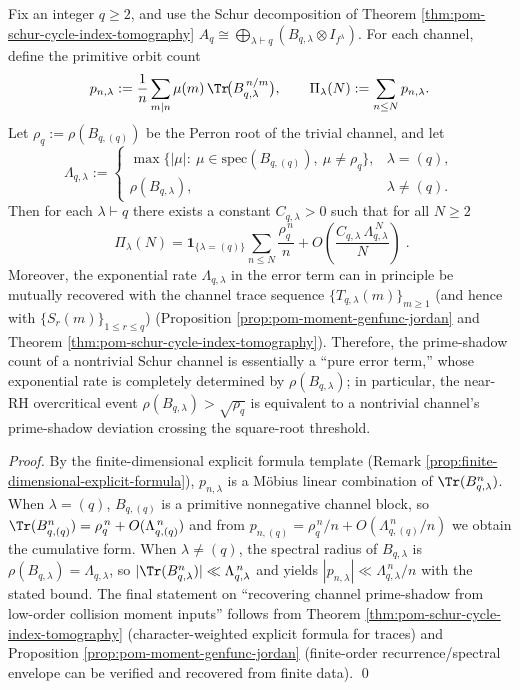 \begin{theorem}\label{thm:pom-schur-chebotarev-prime-deviation}
Fix an integer \(q\ge2\), and use the Schur decomposition of Theorem \ref{thm:pom-schur-cycle-index-tomography}
\(
A_q\cong\bigoplus_{\lambda\vdash q}(B_{q,\lambda}\otimes I_{f^\lambda})
\).
For each channel, define the primitive orbit count
\[
p_{n,\lambda}:=\frac{1}{n}\sum_{m\mid n}\mu(m)\,\Tr\!\bigl(B_{q,\lambda}^{\,n/m}\bigr),
\qquad
\Pi_\lambda(N):=\sum_{n\le N}p_{n,\lambda}.
\]
Let \(\rho_q:=\rho(B_{q,(q)})\) be the Perron root of the trivial channel, and let
\[
\Lambda_{q,\lambda}:=
\begin{cases}
\max\{|\mu|:\ \mu\in\mathrm{spec}(B_{q,(q)}),\ \mu\neq \rho_q\}, & \lambda=(q),\\[2pt]
\rho(B_{q,\lambda}), & \lambda\neq(q).
\end{cases}
\]
Then for each \(\lambda\vdash q\) there exists a constant \(C_{q,\lambda}>0\) such that for all \(N\ge2\)
\[
\boxed{\;
\Pi_\lambda(N)
=\mathbf 1_{\{\lambda=(q)\}}\sum_{n\le N}\frac{\rho_q^{\,n}}{n}
+O\!\left(\frac{C_{q,\lambda}\,\Lambda_{q,\lambda}^{\,N}}{N}\right)\; }.
\]
Moreover, the exponential rate \(\Lambda_{q,\lambda}\) in the error term can in principle be mutually recovered with the channel trace sequence \(\{T_{q,\lambda}(m)\}_{m\ge1}\) (and hence with \(\{S_r(m)\}_{1\le r\le q}\)) (Proposition \ref{prop:pom-moment-genfunc-jordan} and Theorem \ref{thm:pom-schur-cycle-index-tomography}).
Therefore, the prime-shadow count of a nontrivial Schur channel is essentially a ``pure error term,'' whose exponential rate is completely determined by \(\rho(B_{q,\lambda})\); in particular, the near-RH overcritical event
\(
\rho(B_{q,\lambda})>\sqrt{\rho_q}
\)
is equivalent to a nontrivial channel's prime-shadow deviation crossing the square-root threshold.
\end{theorem}
\begin{proof}
By the finite-dimensional explicit formula template (Remark \ref{prop:finite-dimensional-explicit-formula}), \(p_{n,\lambda}\) is a Möbius linear combination of \(\Tr(B_{q,\lambda}^n)\).
When \(\lambda=(q)\), \(B_{q,(q)}\) is a primitive nonnegative channel block, so
\(
\Tr(B_{q,(q)}^n)=\rho_q^{\,n}+O(\Lambda_{q,(q)}^{\,n})
\)
and from \(p_{n,(q)}=\rho_q^{\,n}/n+O(\Lambda_{q,(q)}^{\,n}/n)\) we obtain the cumulative form.
When \(\lambda\neq(q)\), the spectral radius of \(B_{q,\lambda}\) is \(\rho(B_{q,\lambda})=\Lambda_{q,\lambda}\), so \(|\Tr(B_{q,\lambda}^n)|\ll \Lambda_{q,\lambda}^{\,n}\) and yields \(|p_{n,\lambda}|\ll \Lambda_{q,\lambda}^{\,n}/n\) with the stated bound.
The final statement on ``recovering channel prime-shadow from low-order collision moment inputs'' follows from Theorem \ref{thm:pom-schur-cycle-index-tomography} (character-weighted explicit formula for traces) and Proposition \ref{prop:pom-moment-genfunc-jordan} (finite-order recurrence/spectral envelope can be verified and recovered from finite data). \qed
\end{proof}

